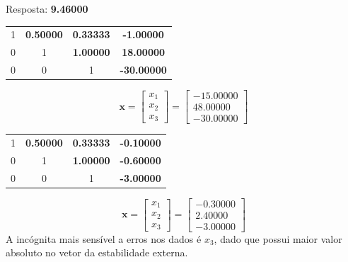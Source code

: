 \setcounter{chapter}{14}
{
\renewcommand{\thesubsection}{\thesection\alph{subsection}}


Resposta: \textbf{9.46000}



\begin{center}
    \begin{tabular}{ c c c | c}
        1 & \textbf{0.50000} & \textbf{0.33333} & \textbf{-1.00000} \\
        0 & 1 & \textbf{1.00000} & \textbf{18.00000} \\
        0 & 0 & 1 & \textbf{-30.00000}
    \end{tabular}
\end{center}
\begin{equation*}
    \mathbf{x}
    =\begin{bmatrix} x_1 \\ x_2 \\ x_3 \end{bmatrix}
    =\begin{bmatrix} -15.00000 \\ 48.00000 \\ -30.00000 \end{bmatrix}
\end{equation*}
\begin{center}
    \begin{tabular}{ c c c | c}
        1 & \textbf{0.50000} & \textbf{0.33333} & \textbf{-0.10000} \\
        0 & 1 & \textbf{1.00000} & \textbf{-0.60000} \\
        0 & 0 & 1 & \textbf{-3.00000}
    \end{tabular}
\end{center}
\begin{equation*}
    \mathbf{x}
    =\begin{bmatrix} x_1 \\ x_2 \\ x_3 \end{bmatrix}
    =\begin{bmatrix} -0.30000 \\ 2.40000 \\ -3.00000 \end{bmatrix}
\end{equation*}
A incógnita mais sensível a erros nos dados é $x_3$, dado que possui maior valor absoluto no vetor da estabilidade externa.

}
